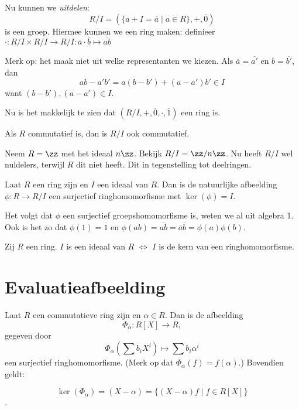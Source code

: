 \documentclass[a4paper,12pt,oneside]{book}
\begin{document}
Nu kunnen we \textit{uitdelen}: 
\[R/I = (\{a + I = \overline{a} \mid a \in R \},+, \overline{0})\]
is een groep. Hiermee kunnen we een ring maken:
definieer $\cdot : R/I \times R/I \to R/I : \overline{a} \cdot \overline{b} \mapsto \overline{ab}$

Merk op: het maak niet uit welke representanten we kiezen.
Als $\overline{a} = \overline{a'}$ en $\overline{b} = \overline{b'}$, dan
$$ ab - a'b' = a(b-b') + (a - a')b' \in I$$
want $(b-b'), (a-a') \in I$.

Nu is het makkelijk te zien dat $(R/I, +, \overline{0}, \cdot, \overline{1})$ een ring is.

\begin{opmerking}
Als $R$ commutatief is, dan is $R/I$ ook commutatief.
\end{opmerking}

\begin{voorbeeld}
Neem $R=\zz$ met het ideaal $n\zz$. Bekijk $R/I = \zz/n\zz$. Nu heeft $R/I$ wel nuldelers, terwijl $R$ dit niet heeft. Dit in tegenstelling tot deelringen.
\end{voorbeeld}

\begin{stelling}
Laat $R$ een ring zijn en $I$ een ideaal van $R$. Dan is de natuurlijke afbeelding $\phi : R \to R/I$
een surjectief ringhomomorfisme met $\ker(\phi) = I$.
\end{stelling}

\begin{bewijs}
Het volgt dat $\phi$ een surjectief groepshomomorfisme is, weten we al uit algebra 1.
Ook is het zo dat $\phi(1) = \overline{1}$ en $\phi(ab) = \overline{ab} = \overline{a}\overline{b} = \phi(a)\phi(b)$. 
\end{bewijs}

\begin{gevolg}
Zij $R$ een ring. $I$ is een ideaal van $R$ $\iff$ $I$ is de kern van een ringhomomorfisme. 
\end{gevolg}

\section{Evaluatieafbeelding}
\begin{stelling}
Laat $R$ een commutatieve ring zijn en $\alpha \in R.$ Dan is de afbeelding
$$\Phi_{\alpha} : R[X] \to R, $$
 gegeven door 
 $$\Phi_{\alpha}(\sum b_iX^i) \mapsto \sum b_i{\alpha}^i$$
een surjectief ringhomomorfisme. 
(Merk op dat $\Phi_{\alpha} (f ) = f (\alpha)$.) 
Bovendien geldt:

$$\ker(\Phi_{\alpha} ) = (X - \alpha) = \{(X - \alpha)f \mid  f \in R[X]\}$$.
\end{stelling}
\end{document}
